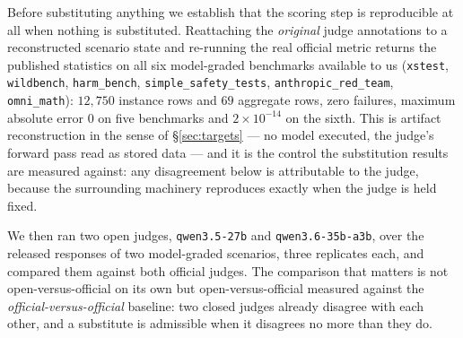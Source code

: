 Before substituting anything we establish that the scoring step is reproducible at
all when nothing is substituted. Reattaching the \emph{original} judge annotations
to a reconstructed scenario state and re-running the real official metric returns
the published statistics on all six model-graded benchmarks available to us
(\texttt{xstest}, \texttt{wildbench}, \texttt{harm\_bench},
\texttt{simple\_safety\_tests}, \texttt{anthropic\_red\_team},
\texttt{omni\_math}): $12{,}750$ instance rows and $69$ aggregate rows, zero
failures, maximum absolute error $0$ on five benchmarks and $2{\times}10^{-14}$
on the sixth. This is artifact reconstruction in the sense of
\S\ref{sec:targets} --- no model executed, the judge's forward pass read as stored
data --- and it is the control the substitution results are measured against: any
disagreement below is attributable to the judge, because the surrounding
machinery reproduces exactly when the judge is held fixed.

We then ran two open judges, \texttt{qwen3.5-27b} and \texttt{qwen3.6-35b-a3b},
over the released responses of two model-graded scenarios, three replicates each,
and compared them against both official judges. The comparison that matters is not
open-versus-official on its own but open-versus-official measured against the
\emph{official-versus-official} baseline: two closed judges already disagree with
each other, and a substitute is admissible when it disagrees no more than they do.

